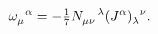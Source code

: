 \begin{equation*}
\omega_\mu^{\!~~\alpha} = - \hbox{$\frac{1}{7}$} N_{\mu\nu}^{~~~\lambda}
(J^\alpha)_\lambda^{\!~~\nu}.
\end{equation*}

